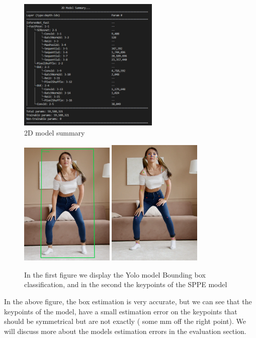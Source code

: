 \begin{figure}[h]
	\centering
	\includegraphics[width=0.6\textwidth]{figures/Implementation/2DModelAr.png}
	\captionsetup{labelformat=empty}
	\caption{2D model summary}
\end{figure}

\pagebreak

\begin{figure}[htp]
    \centering
    \includegraphics[width=0.4\textwidth]{figures/Implementation/YoloModel.png}%
    \qquad
    \includegraphics[width=0.4\textwidth]{figures/Implementation/SPPE.png}%
    \qquad
    \captionsetup{labelformat=empty}
    \caption{In the first figure we display the Yolo model Bounding box classification, and in the second the keypoints of the SPPE model}%
\end{figure}


In the above figure, the box estimation is very accurate, but we can see that the keypoints of the model, have a small estimation error on the keypoints that should be symmetrical but are not exactly ( some mm off the right point). We will discuss more about the models estimation errors in the evaluation section.